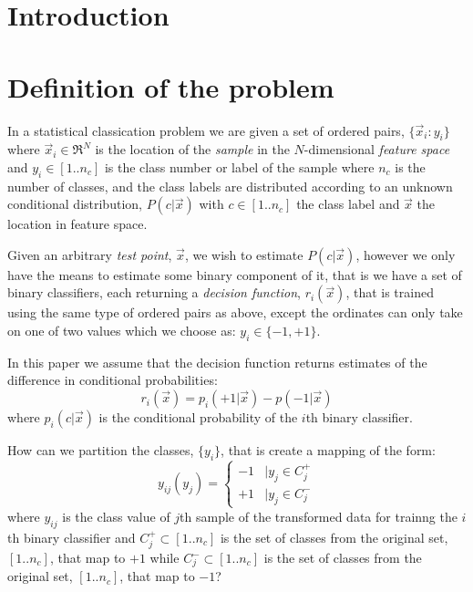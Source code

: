 \documentclass{article}
\begin{document}
\section{Introduction}

\section{Definition of the problem}

\label{description}

In a statistical classication problem we are given a set of ordered pairs, 
$\lbrace \vec x_i : y_i \rbrace$ 
where $\vec x_i \in \Re^N$ is the location of the {\it sample} in 
the $N$-dimensional {\it feature space} 
and $y_i \in [1..n_c]$ is the class number or label of the sample
where $n_c$ is the number of classes,
and the class labels are
distributed according to an unknown conditional distribution,
$P(c | \vec x)$ with $c \in [1..n_c]$ the class label and $\vec x$ the location
in feature space.

Given an arbitrary {\it test point}, $\vec x$, 
we wish to estimate $P(c | \vec x)$, however we only have
the means to estimate some binary component of it, that is we have a 
set of binary classifiers, 
each returning a {\it decision function}, $r_i(\vec x)$, that is
trained using the same type of ordered pairs as above, 
except the ordinates can only take on one of two values
which we choose as: $y_i \in \lbrace -1, +1 \rbrace$.

In this paper we assume that the decision function 
returns estimates of the difference in conditional probabilities:
\begin{equation}
	r_i(\vec x) = p_i(+1|\vec x) - p(-1|\vec x)
\end{equation}
where $p_i(c|\vec x)$ is the conditional probability of the $i$th
binary classifier.

How can we partition the classes, $\lbrace y_i \rbrace$, that is create
a mapping of the form:
\begin{equation}
	y_{ij} (y_j) = \left \lbrace  \begin{array}{lr}
-1 & | y_j \in C_j^+ \\
+1 & | y_j \in C_j^-
\end{array}
\right .
\end{equation}
where $y_{ij}$ is the class value of $j$th sample of the transformed data 
for trainng the $i$th binary classifier and 
$C_j^+ \subset [1..n_c]$ is the set of classes from the original set, 
$[1..n_c]$, that map to $+1$ while
$C_j^- \subset [1..n_c]$ is the set of classes from the original set, 
$[1..n_c]$, that map to $-1$?
\end{document}
